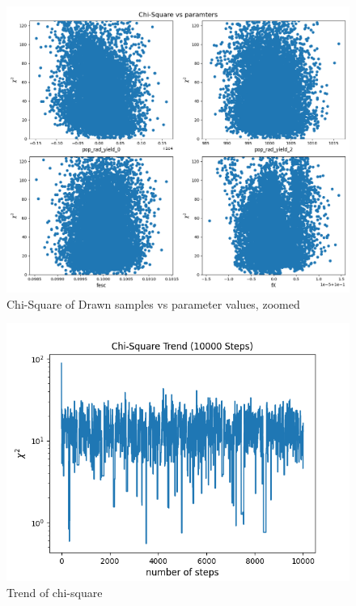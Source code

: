 \documentclass[12pt, TexShade, letterpaper]{report}
\begin{document}
\begin{figure}[h!]
\centering
\includegraphics[scale =0.5]{csq_vs_params_zoomed_known_curve.png}
\caption[Chi-Square of Drawn samples vs parameter values, zoomed]{Chi-Square of Drawn samples vs parameter values, zoomed}
\label{fig:csq_vs_params_zoomed_known_curve}
\end{figure}

\begin{figure}[h!]
\centering
\includegraphics[scale =0.9]{csq_trend_knwon_curve.png}
\caption[Trend of chi-square]{Trend of chi-square}
\label{fig:csq_trend_knwon_curve}
\end{figure}
\end{document}
